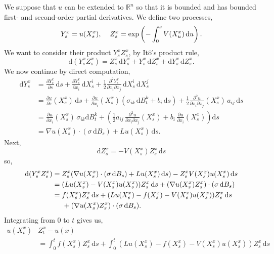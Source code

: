 \documentclass[a4paper,12pt,draft]{report}
\theoremstyle{remark}
\theoremstyle{definition}
\begin{document}
{
We suppose that $u$ can be extended to $\mathbb{R}^n$ so that it is bounded and has bounded first- and second-order partial derivatives.  We define two processes,
$$
Y_s^x = u(X_s^x), \hspace{0.4cm} Z_s^x = \exp\left(-\int_0^sV(X_u^x)\,\mathrm{d}u\right).
$$
We want to consider their product $Y_s^xZ_s^x$, by It$\mathrm{\hat{o}}$'s product rule,
$$
\mathrm{d}(Y_s^xZ_s^x) = Z_s^x\,\mathrm{d}Y_s^x + Y_s^x\,\mathrm{d}Z_s^x + \mathrm{d}Y_s^x\,\mathrm{d}Z_s^x.
$$
We now continue by direct computation,
\begin{align}
\mathrm{d}Y_s^x & = \frac{\partial Y_s^x}{\partial s}\,\mathrm{d}s + \frac{\partial Y_s^x}{\partial x_i}\,\mathrm{d}X_s^i + \frac{1}{2}\frac{\partial^2 Y_s^x}{\partial x_i \partial x_j}\,\mathrm{d}X_s^i\,\mathrm{d}X_s^j\nonumber\\
& = \frac{\partial u}{\partial s}(X_s^x)\,\mathrm{d}s + \frac{\partial u}{\partial x_i}(X_s^x)(\sigma_{ik}\,\mathrm{d}B_t^k + b_i\,\mathrm{d}s) + \frac{1}{2}\frac{\partial^2 u}{\partial x_i \partial x_j}(X_s^x)\,a_{ij}\,\mathrm{d}s\nonumber\\
& = \frac{\partial u}{\partial x_i}(X_s^x)\,\sigma_{ik}\mathrm{d}B_t^k + \left(\frac{1}{2}a_{ij}\,\frac{\partial^2 u}{\partial x_i \partial x_j}(X_s^x) + b_i\,\frac{\partial u}{\partial x_i}(X_s^x)\right)\mathrm{d}s\nonumber\\
& = \nabla u(X_s^x)\cdot(\sigma\,\mathrm{d}B_s) + Lu(X_s^x)\,\mathrm{d}s.\nonumber
\end{align}
Next,
$$
\mathrm{d}Z_s^x = -V(X_s^x)Z_s^x\,\mathrm{d}s
$$
so,
\begin{align}
\mathrm{d}(Y_s^xZ_s^x) & = Z_s^x(\nabla u(X_s^x)\cdot(\sigma\,\mathrm{d}B_s) + Lu(X_s^x)\,\mathrm{d}s) - Z_s^xV(X_s^x)u(X_s^x)\,\mathrm{d}s\nonumber\\
& = (Lu(X_s^x) - V(X_s^x)u(X_s^x))Z_s^x\,\mathrm{d}s + (\nabla u(X_s^x)Z_s^x)\cdot(\sigma\,\mathrm{d}B_s)\nonumber\\
& = f(X_s^x)Z_s^x\,\mathrm{d}s + (Lu(X_s^x) - f(X_s^x) - V(X_s^x)u(X_s^x))Z_s^x\,\mathrm{d}s \nonumber\\
& \hspace{0.5cm} + (\nabla u(X_s^x)Z_s^x)\cdot(\sigma\,\mathrm{d}B_s).\nonumber
\end{align}
Integrating from $0$ to $t$ gives us,
\begin{align}
u(X_t^x) & Z_t^x - u(x)\nonumber\\
& = \int_0^tf(X_s^x)Z_s^x\,\mathrm{d}s + \int_0^t(Lu(X_s^x) - f(X_s^x) - V(X_s^x)u(X_s^x))Z_s^x\,\mathrm{d}s\nonumber\\

\end{align}}
\end{document}
